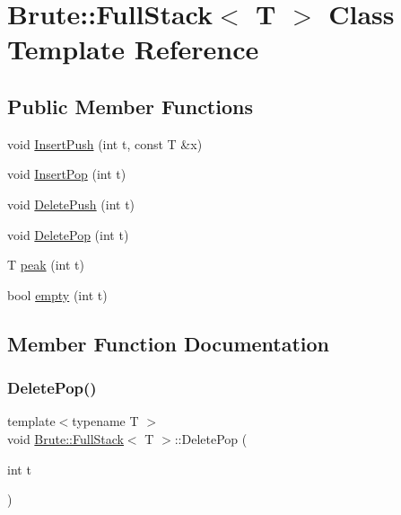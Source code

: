 \hypertarget{classBrute_1_1FullStack}{}\section{Brute\+:\+:Full\+Stack$<$ T $>$ Class Template Reference}
\label{classBrute_1_1FullStack}
\subsection*{Public Member Functions}
\begin{DoxyCompactItemize}
\item 
void \hyperlink{classBrute_1_1FullStack_a1a13a85e8057ab8fd580338302d4bcf2}{Insert\+Push} (int t, const T \&x)
\item 
void \hyperlink{classBrute_1_1FullStack_a58e756878b0de463055270a3842cffb9}{Insert\+Pop} (int t)
\item 
void \hyperlink{classBrute_1_1FullStack_af5b113d29c107b6c6271ed07e2d715c4}{Delete\+Push} (int t)
\item 
void \hyperlink{classBrute_1_1FullStack_aa99882df39da166fe8bb6995f4c07213}{Delete\+Pop} (int t)
\item 
T \hyperlink{classBrute_1_1FullStack_ae6dfa8e6ea0f0d8de2c50afaf9991aaf}{peak} (int t)
\item 
bool \hyperlink{classBrute_1_1FullStack_abad599473f0e06b91d4cf5a5909bb58c}{empty} (int t)
\end{DoxyCompactItemize}


\subsection{Member Function Documentation}
\mbox{\label{classBrute_1_1FullStack_aa99882df39da166fe8bb6995f4c07213}} 
\subsubsection{\texorpdfstring{Delete\+Pop()}{DeletePop()}}
{\footnotesize\ttfamily template$<$typename T $>$ \\
void \hyperlink{classBrute_1_1FullStack}{Brute\+::\+Full\+Stack}$<$ T $>$\+::Delete\+Pop (\begin{DoxyParamCaption}\item[{int}]{t }\end{DoxyParamCaption})}

